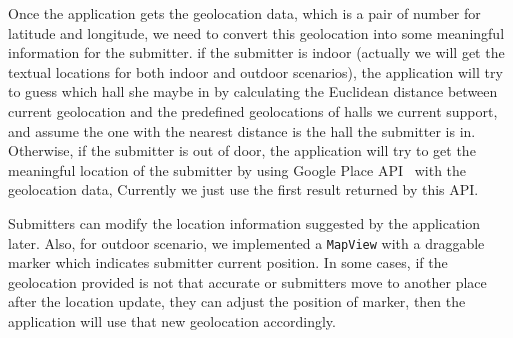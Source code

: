 \documentclass{acm_proc_article-sp}
\begin{document}
 Once the application gets the geolocation data, which is a pair of number for latitude and longitude, 
 we need to convert this geolocation into some meaningful information for the submitter.
 if the submitter is indoor (actually we will get the textual locations for both indoor and outdoor scenarios), 
 the application will try to guess which hall she maybe in by calculating the Euclidean distance between current geolocation 
 and the predefined geolocations of halls we current support, and assume the one with the nearest distance is the hall the submitter is in. 
 Otherwise, if the submitter is out of door, the application will try to get the meaningful location of the submitter by using 
 Google Place API~\cite{google-place-api} with the geolocation data, Currently we just use the first result returned by this API.
 
 Submitters can modify the location information suggested by the application later. Also, for outdoor scenario, 
 we implemented a \texttt{MapView} with a draggable marker which indicates submitter current position. 
 In some cases, if the geolocation provided is not that accurate or submitters move to another place after the location update, 
 they can adjust the position of marker, then the application will use that new geolocation accordingly.
 
\end{document}
